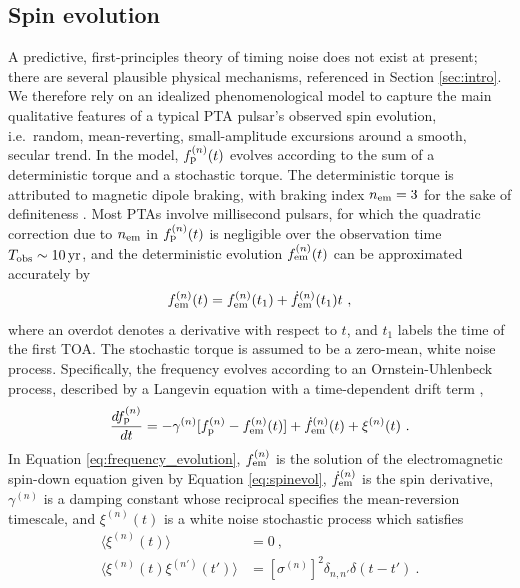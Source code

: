 \documentclass[fleqn,usenatbib,useAMS]{mnras}
\begin{document}
\subsection{Spin evolution} \label{sec:psr_frequency}
A predictive, first-principles theory of timing noise does not exist at present; there are several plausible physical mechanisms, referenced in Section \ref{sec:intro}. We therefore rely on an idealized phenomenological model to capture the main qualitative features of a typical PTA pulsar's observed spin evolution, i.e.\ random, mean-reverting, small-amplitude excursions around a smooth, secular trend. In the model, $f_{\rm p}^{(n)}(t)$ evolves according to the sum of a deterministic torque and a stochastic torque. The deterministic torque is attributed to magnetic dipole braking, with braking index $n_{\rm em}=3$ for the sake of definiteness \citep{1969ApJ...157..869G}. Most PTAs involve millisecond pulsars, for which the quadratic correction due to $n_{\rm em}$ in $f_{\rm p}^{(n)}(t)$ is negligible over the observation time $T_{\rm obs} \sim 10 \, {\rm yr}$, and the deterministic evolution $f_{\rm em}^{(n)}(t)$ can be approximated accurately by 
\begin{equation}
 f_{\rm em}^{(n)}(t) = f_{\rm em}^{(n)}(t_1) + \dot{f}_{\rm em}^{(n)}(t_1)t \ , \label{eq:spinevol}
\end{equation} where an overdot denotes a derivative with respect to $t$, and $t_1$ labels the time of the first TOA. The stochastic torque is assumed to be a zero-mean, white noise process. Specifically, the frequency evolves according to an Ornstein-Uhlenbeck process, described by a Langevin equation with a time-dependent drift term \citep{Vargas},
\begin{equation}
	\frac{df_{\rm p}^{(n)}}{dt} = -\gamma^{(n)}	 [f_{\rm p}^{(n)} - f_{\rm em}^{(n)} (t)] + \dot{f}_{\rm em}^{(n)}(t) +\xi^{(n)}(t) \ . 
	\label{eq:frequency_evolution}
\end{equation}
In Equation \eqref{eq:frequency_evolution}, $f_{\rm em}^{(n)}$ is the solution of the electromagnetic spin-down equation given by Equation \eqref{eq:spinevol}, $\dot{f}_{\rm em}^{(n)}$ is the spin derivative, $\gamma^{(n)}$ is a damping constant whose reciprocal specifies the mean-reversion timescale, and $\xi^{(n)}(t)$ is a white noise stochastic process which satisfies
\begin{align}
	\langle \xi^{(n)}(t) \rangle &= 0 \ , \\
	\langle \xi^{(n)}(t) \xi^{(n')}(t') \rangle &= [\sigma^{(n)}]^2 \delta_{n,n'} \delta (t - t') \ .	\label{eq:xieqn}
\end{align}
\end{document}
